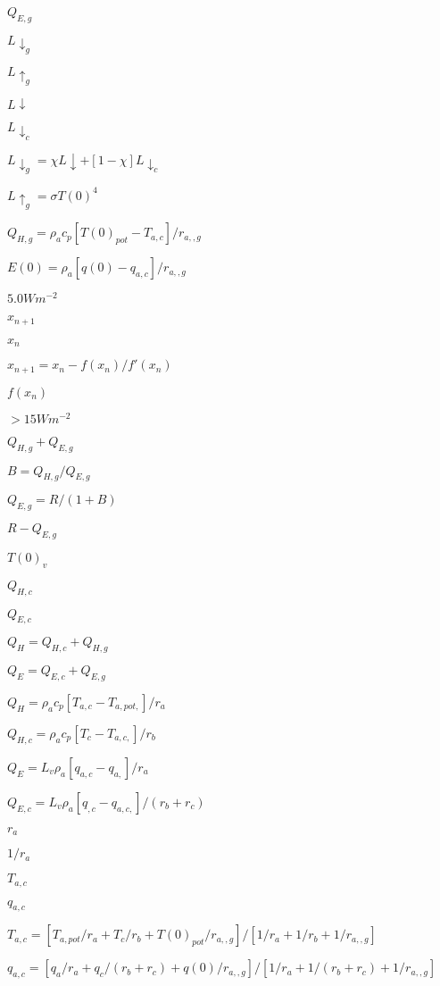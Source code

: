 \documentclass{article}
\begin{document}
{$Q_{E,g}$
\pagebreak

$L \downarrow_g$
\pagebreak

$L \uparrow_g$
\pagebreak

$L \downarrow$
\pagebreak

$L \downarrow_c$
\pagebreak

$L \downarrow_g = \chi L \downarrow + [1 - \chi] L \downarrow_c$
\pagebreak

$L \uparrow_g = \sigma T(0)^4$
\pagebreak

$Q_{H,g} = \rho_a c_p [T(0)_{pot} - T_{a,c} ]/r_{a,,g}$
\pagebreak

$E(0) = \rho_a [q(0) - q_{a,c} ]/r_{a,,g}$
\pagebreak

$5.0 W m^{-2}$
\pagebreak

$x_{n+1}$
\pagebreak

$x_n$
\pagebreak

$x_{n+1} = x_n - f(x_n )/f'(x_n )$
\pagebreak

$f(x_n )$
\pagebreak

$> 15 W m^{-2}$
\pagebreak

$Q_{H,g} + Q_{E,g}$
\pagebreak

$B = Q_{H,g} /Q_{E,g}$
\pagebreak

$Q_{E,g} = R/(1 + B)$
\pagebreak

$R - Q_{E,g}$
\pagebreak

$T(0)_v$
\pagebreak

$Q_{H,c}$
\pagebreak

$Q_{E,c}$
\pagebreak

$Q_H = Q_{H,c} + Q_{H,g}$
\pagebreak

$Q_E = Q_{E,c} + Q_{E,g}$
\pagebreak

$Q_H = \rho_a c_p [T_{a,c} - T_{a,pot,} ]/r_a$
\pagebreak

$Q_{H,c} = \rho_a c_p [T_c - T_{a,c,} ]/r_b$
\pagebreak

$Q_E = L_v \rho_a [q_{a,c} - q_{a,} ]/r_a$
\pagebreak

$Q_{E,c} = L_v \rho_a [q_{,c} - q_{a,c,} ]/(r_b + r_c )$
\pagebreak

$r_a$
\pagebreak

$1/r_a$
\pagebreak

$T_{a,c}$
\pagebreak

$q_{a,c}$
\pagebreak

$T_{a,c} = [T_{a,pot} /r_a + T_c /r_b + T(0)_{pot} /r_{a,,g} ]/[1/r_a + 1/r_b + 1/r_{a,,g} ]$
\pagebreak

$q_{a,c} = [q_a /r_a + q_c /(r_b + r_c ) + q(0)/r_{a,,g} ]/[1/r_a + 1/(r_b + r_c ) + 1/r_{a,,g} ]$
\pagebreak

}
\end{document}
